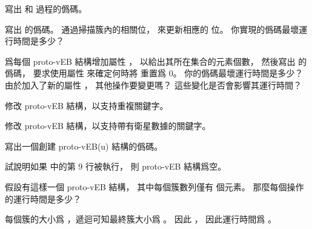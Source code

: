 \startsection[
  title={A recursive structure},
]

\startEXERCISE
寫出  和  過程的僞碼。
\stopEXERCISE

\startANSWER
{}
\stopANSWER

\startEXERCISE
寫出  的僞碼。
通過掃描簇內的相關位，
來更新相應的  位。
你實現的僞碼最壞運行時間是多少？
\stopEXERCISE

\startANSWER
{}
\stopANSWER

\startEXERCISE
爲每個 proto-vEB 結構增加屬性 ，
以給出其所在集合的元素個數，
然後寫出  的僞碼，
要求使用屬性  來確定何時將  重置爲 0。
你的僞碼最壞運行時間是多少？
由於加入了新的屬性 ，
其他操作要變更嗎？
這些變化是否會影響其運行時間？
\stopEXERCISE

\startANSWER
{}
\stopANSWER

\startEXERCISE
修改 proto-vEB 結構，以支持重複關鍵字。
\stopEXERCISE

\startANSWER
{}
\stopANSWER

\startEXERCISE
修改 proto-vEB 結構，以支持帶有衛星數據的關鍵字。
\stopEXERCISE

\startANSWER
{}
\stopANSWER

\startEXERCISE
寫出一個創建 proto-vEB(u) 結構的僞碼。
\stopEXERCISE

\startANSWER
{}
\stopANSWER

\startEXERCISE
試說明如果  中的第 9 行被執行，
則 proto-vEB 結構爲空。
\stopEXERCISE

\startANSWER
{}
\stopANSWER

\startEXERCISE
假設有這樣一個 proto-vEB 結構，
其中每個簇數列僅有  個元素。
那麼每個操作的運行時間是多少？
\stopEXERCISE

\startANSWER
每個簇的大小爲 ，遞迴可知最終簇大小爲 。
因此 ，
因此運行時間爲 。
\stopANSWER

\stopsection
